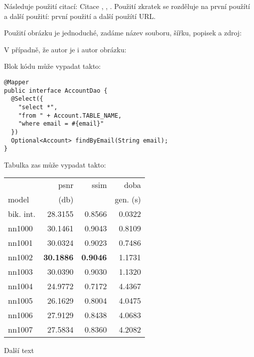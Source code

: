 			Následuje použití citací: Citace \cite{html_hypertext_markup_language}, \cite{hibernate_docs}, \cite{ddd_quickly}.
			Použití zkratek se rozděluje na první použítí a další použití: první použití  a další použítí \ac{URL}.

			Použití obrázku je jednoduché, zadáme název souboru, šířku, popisek a zdroj:


			V případně, že autor je i autor obrázku:


			Blok kódu může vypadat takto:

			\begin{codeblock}
				\begin{verbatim}
@Mapper
public interface AccountDao {
  @Select({
    "select *",
    "from " + Account.TABLE_NAME,
    "where email = #{email}"
  })
  Optional<Account> findByEmail(String email);
}
				\end{verbatim}
			\end{codeblock}

			Tabulka zas může vypadat takto:

			\begin{table}[hbt!]
				\centering
				\begin{tabular}{| l | r | r | r | }
					\hline
					&        psnr &      ssim &      doba  \\
					model &       (db)    &           & gen. (s) \\
					\hline
					bik. int. & 28.3155 & 0.8566 & 0.0322 \\
					nn1000    & 30.1461 & 0.9043 & 0.8109 \\
					nn1001    & 30.0324 & 0.9023 & 0.7486 \\
					nn1002    & \textbf{30.1886} & \textbf{0.9046} & 1.1731 \\
					nn1003    & 30.0390 & 0.9030 & 1.1320 \\
					nn1004    & 24.9772 & 0.7172 & 4.4367 \\
					nn1005    & 26.1629 & 0.8004 & 4.0475 \\
					nn1006    & 27.9129 & 0.8438 & 4.0683 \\
					nn1007    & 27.5834 & 0.8360 & 4.2082 \\
					\hline
				\end{tabular}
			\end{table}

			\newpage

			Další text


